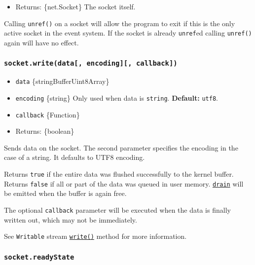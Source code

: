 \begin{itemize}
\tightlist
\item
  Returns: \{net.Socket\} The socket itself.
\end{itemize}

Calling \texttt{unref()} on a socket will allow the program to exit if
this is the only active socket in the event system. If the socket is
already \texttt{unref}ed calling \texttt{unref()} again will have no
effect.

\subsubsection{\texorpdfstring{\texttt{socket.write(data{[},\ encoding{]}{[},\ callback{]})}}{socket.write(data{[}, encoding{]}{[}, callback{]})}}\label{socket.writedata-encoding-callback}

\begin{itemize}
\tightlist
\item
  \texttt{data} \{string\textbar Buffer\textbar Uint8Array\}
\item
  \texttt{encoding} \{string\} Only used when data is \texttt{string}.
  \textbf{Default:} \texttt{utf8}.
\item
  \texttt{callback} \{Function\}
\item
  Returns: \{boolean\}
\end{itemize}

Sends data on the socket. The second parameter specifies the encoding in
the case of a string. It defaults to UTF8 encoding.

Returns \texttt{true} if the entire data was flushed successfully to the
kernel buffer. Returns \texttt{false} if all or part of the data was
queued in user memory.
\hyperref[event-drain]{\texttt{\textquotesingle{}drain\textquotesingle{}}}
will be emitted when the buffer is again free.

The optional \texttt{callback} parameter will be executed when the data
is finally written out, which may not be immediately.

See \texttt{Writable} stream
\href{stream.md\#writablewritechunk-encoding-callback}{\texttt{write()}}
method for more information.

\subsubsection{\texorpdfstring{\texttt{socket.readyState}}{socket.readyState}}\label{socket.readystate}


